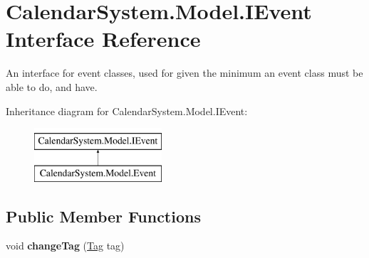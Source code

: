 \hypertarget{interface_calendar_system_1_1_model_1_1_i_event}{\section{Calendar\+System.\+Model.\+I\+Event Interface Reference}
\label{interface_calendar_system_1_1_model_1_1_i_event}
}


An interface for event classes, used for given the minimum an event class must be able to do, and have.  


Inheritance diagram for Calendar\+System.\+Model.\+I\+Event\+:\begin{figure}[H]
\begin{center}
\leavevmode
\includegraphics[height=2.000000cm]{interface_calendar_system_1_1_model_1_1_i_event}
\end{center}
\end{figure}
\subsection*{Public Member Functions}
\begin{DoxyCompactItemize}
\item 
\hypertarget{interface_calendar_system_1_1_model_1_1_i_event_a6a455d39dad509964a5f641980f248dd}{void {\bfseries change\+Tag} (\hyperlink{class_calendar_system_1_1_model_1_1_tag}{Tag} tag)}\label{interface_calendar_system_1_1_model_1_1_i_event_a6a455d39dad509964a5f641980f248dd}

\end{DoxyCompactItemize}
